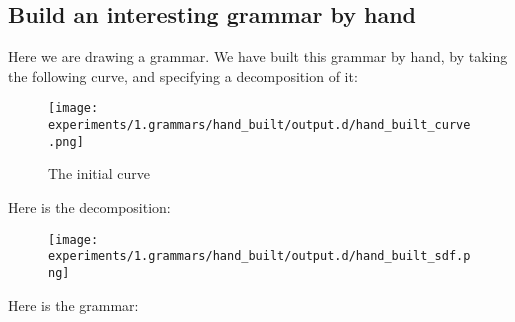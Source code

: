 

\subsection{Build an interesting grammar by hand}


Here we are drawing a grammar. We have built this grammar by hand, by
taking the following curve, and specifying a decomposition of it:

\begin{figure}
\texttt{[image: experiments/1.grammars/hand\_built/output.d/hand\_built\_curve.png]}
\caption{The initial curve}
\end{figure}

Here is the decomposition:
\begin{figure}
\texttt{[image: experiments/1.grammars/hand\_built/output.d/hand\_built\_sdf.png]}
\end{figure}

Here is the grammar:

\begin{figure}

\end{figure}

